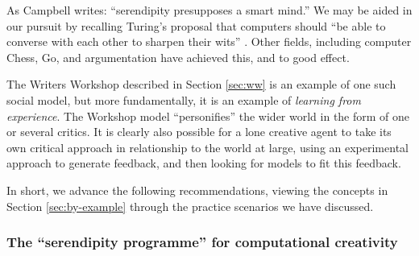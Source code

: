 As Campbell \citeyear{campbell} writes: ``serendipity
presupposes a smart mind.''  We may be aided in our pursuit by
recalling Turing's proposal that computers should ``be able to
converse with each other to sharpen their wits''
\cite{turing-intelligent}.  Other fields, including computer Chess,
Go, and argumentation have achieved this, and to good effect.

The Writers Workshop described in Section \ref{sec:ww} is an example
of one such social model, but more fundamentally, it is an example of
\emph{learning from experience}.  The Workshop model ``personifies''
the wider world in the form of one or several critics.  It is clearly
also possible for a lone creative agent to take its own critical
approach in relationship to the world at large, using an experimental
approach to generate feedback, and then looking for models to fit this
feedback.


In short, we advance the following recommendations, viewing the
concepts in Section \ref{sec:by-example} through the practice
scenarios we have discussed.

\subsubsection*{The ``serendipity programme'' for computational creativity}

